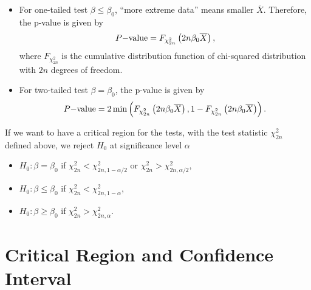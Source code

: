 \begin{itemize}
	\item For one-tailed test $\beta\leq \beta_0$, ``more extreme data'' means smaller $\overline{X}$. Therefore, the p-value is given by
	\begin{align*}
	P\mathrm{-value} = F_{\chi_{2n}^2}\left(2n\beta_0\overline{X} \right),
	\end{align*}
	where $F_{\chi_{2n}^2}$ is the cumulative distribution function of chi-squared distribution with $2n$ degrees of freedom.
	\item For two-tailed test $\beta = \beta_0$, the p-value is given by
	\begin{align*}
	P\mathrm{-value} = 2\min\left(F_{\chi_{2n}^2}\left(2n\beta_0\overline{X} \right), 1-F_{\chi_{2n}^2}\left(2n\beta_0\overline{X} \right) \right).
	\end{align*}
\end{itemize}
If we want to have a critical region for the tests, with the test statistic $\chi_{2n}^2$ defined above, we reject $H_0$ at significance level $\alpha$
\begin{itemize}
	\item $H_0: \beta = \beta_0$ if $\chi_{2n}^2 < \chi_{2n, 1-\alpha/2}^2$ or $\chi_{2n}^2 > \chi_{2n, \alpha/2}^2$,
	\item $H_0: \beta \leq \beta_0$ if $\chi_{2n}^2 < \chi_{2n, 1-\alpha}^2$,
	\item $H_0: \beta \geq \beta_0$ if $\chi_{2n}^2 > \chi_{2n, \alpha}^2$.
\end{itemize}

\section*{Critical Region and Confidence Interval}

